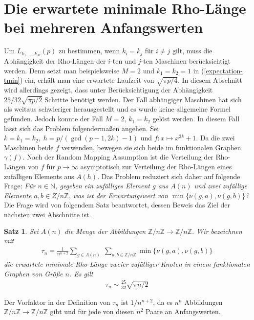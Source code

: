 \documentclass[a4paper, 10pt, ngerman]{article}
\newcommand{\N}{\mathbb{N}}
\newcommand{\Z}{\mathbb{Z}}
\newtheorem{theorem}{Satz}
\begin{document}
    \section{Die erwartete minimale Rho-Länge bei mehreren Anfangswerten}

    Um $L_{k_1, \dots, k_M}(p)$ zu bestimmen, wenn $k_i = k_j$ für $i \ne j$ gilt, muss die Abhängigkeit der Rho-Längen der $i$-ten und $j$-ten Maschinen berücksichtigt werden. Denn setzt man beispielsweise $M = 2$ und $k_1 = k_2 = 1$ in (\ref{expectation-tmin}) ein, erhält man eine erwartete Laufzeit von $\sqrt {\pi p / 4}$. In diesem Abschnitt wird allerdings gezeigt, dass unter Berücksichtigung der Abhängigkeit $25/32 \sqrt{\pi p / 2}$ Schritte benötigt werden. Der Fall abhängiger Maschinen hat sich als weitaus schwieriger herausgestellt und es wurde keine allgemeine Formel gefunden. Jedoch konnte der Fall $M = 2, \, k_1 = k_2$ gelöst werden. In diesem Fall lässt sich das Problem folgendermaßen angehen. Sei $k = k_1 = k_2, \; h = p/(\gcd(p - 1, 2k) - 1)$ und $f : x \mapsto x^{2k} + 1$. Da die zwei Maschinen beide $f$ verwenden, bewegen sie sich beide im funktionalen Graphen $\gamma(f)$. Nach der Random Mapping Assumption ist die Verteilung der Rho-Längen von $f$ für $p \to \infty$ asymptotisch zur Verteilung der Rho-Längen eines zufälligen Elements aus $A(h)$. Das Problem reduziert sich daher auf folgende Frage: \emph{Für $n \in \N$, gegeben ein zufälliges Element $g$ aus $A(n)$ und zwei zufällige Elemente $a, b \in Z/n\Z$, was ist der Erwartungswert von $\min\{\nu(g, a), \nu(g, b)\}$?} Die Frage wird von folgendem Satz beantwortet, dessen Beweis das Ziel der nächsten zwei Abschnitte ist.

    \begin{theorem}
        \label{theorem:min-rho-len-m2}
        Sei $A(n)$ die Menge der Abbildungen $\Z/n\Z \to \Z/n\Z$. Wir bezeichnen mit
        \begin{align*}
            \tau_n =  \frac 1 {n^{n + 2}}
            \sum_{g \in A(n)} \; \sum_{a, b \in \Z/n\Z}
            \min\{\nu(g, a), \nu(g, b)\}
        \end{align*}
        die erwartete minimale Rho-Länge zweier zufälliger Knoten in einem funktionalen Graphen von Größe $n$. Es gilt
        \begin{align*}
            \tau_n \sim \frac {25} {32} \sqrt{\pi n / 2}
        \end{align*}
    \end{theorem}

    \noindent Der Vorfaktor in der Definition von $\tau_n$ ist $1/n^{n + 2}$, da es $n^n$ Abbildungen $\Z/n\Z \to \Z/n\Z$ gibt und für jede von diesen $n^2$ Paare an Anfangswerten.
\end{document}
